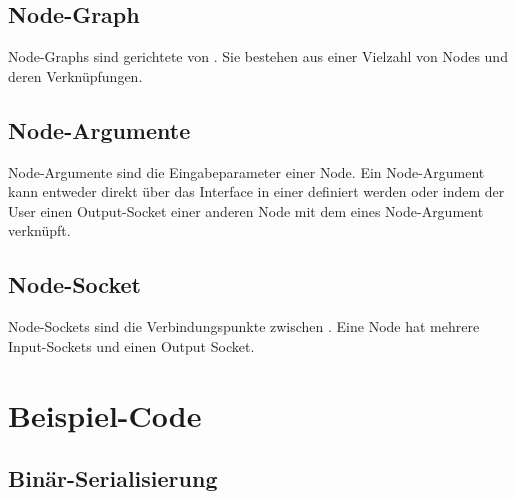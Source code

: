 \documentclass[ngerman]{article}
\begin{document}
\subsection{Node-Graph}
\label{sec:node_graph}
Node-Graphs sind gerichtete  von . Sie bestehen aus einer Vielzahl von Nodes und deren Verknüpfungen. 

\subsection{Node-Argumente}
\label{sec:node_argumente}
Node-Argumente sind die Eingabeparameter einer Node. Ein Node-Argument kann entweder direkt über das Interface in einer  definiert werden oder indem der User einen Output-Socket einer anderen Node mit dem  eines Node-Argument verknüpft.

\subsection{Node-Socket}
\label{sec:node_socket}
Node-Sockets sind die Verbindungspunkte zwischen . Eine Node hat mehrere Input-Sockets und einen Output Socket.

\pagebreak

\section{Beispiel-Code}
\subsection{Binär-Serialisierung}
\label{sec:code_nested_encoding}
\end{document}
